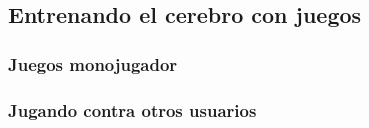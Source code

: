 \subsection{Entrenando el cerebro con juegos}

\subsubsection{Juegos monojugador}

\subsubsection{Jugando contra otros usuarios}
